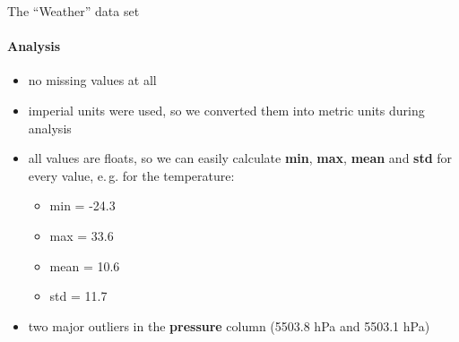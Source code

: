 
\begin{frame}{The \enquote{Weather} data set}
\framesubtitle{Analysis}

\begin{itemize}
    \item no missing values at all
    \item imperial units were used, so we converted them into metric units during analysis
    \item all values are floats, so we can easily calculate \textbf{min}, \textbf{max}, \textbf{mean} and \textbf{std} for every value, e.\,g. for the temperature:
    \begin{itemize}
        \item min = -24.3 \degc
        \item max = 33.6 \degc
        \item mean = 10.6 \degc
        \item std = 11.7 \degc
    \end{itemize}
    \item two major outliers in the \textbf{pressure} column (5503.8 hPa and 5503.1 hPa)
\end{itemize}

\end{frame}

